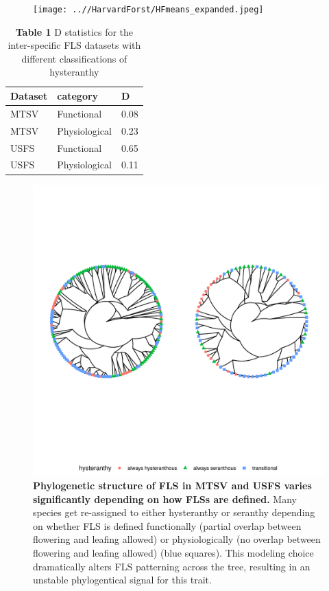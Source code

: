 \documentclass[12pt]{article}\usepackage[]{graphicx}\usepackage[]{color}
\begin{document}
\begin{figure}[h!]
    \centering
 \texttt{[image: ..//HarvardForst/HFmeans\_expanded.jpeg]} 
    \caption{\textbf{}}
    \label{fig:HFmeans}
\end{figure}

\begin{table}[ht]
\centering
\begin{tabular}{l|l|l}
  \hline
Dataset & category & D \\ 
  \hline
MTSV & Functional & 0.08 \\ 
  MTSV & Physiological & 0.23 \\ 
  USFS & Functional & 0.65 \\ 
  USFS & Physiological & 0.11 \\ 
   \hline
\end{tabular}
\caption{\textbf{Table 1} D statistics for the inter-specific FLS datasets with different classifications of hysteranthy} 
\label{tab:Table S1}
\end{table}


\begin{figure}[H]

\includegraphics[width=7.5in]{figure/Code_chunk_Minimal_example3-1} 

   
  \caption{\textbf{Phylogenetic structure of FLS in MTSV and USFS varies significantly depending on how FLSs are defined.} Many species get re-assigned to either hysteranthy or seranthy depending on whether FLS is defined functionally (partial overlap between flowering and leafing allowed) or physiologically (no overlap between flowering and leafing allowed) (blue squares). This modeling choice dramatically alters FLS patterning across the tree, resulting in an unstable phylogentical signal for this trait.}
    \label{fig:phylogenies}
    \end{figure}
  
  
\pagebreak

\end{document}
